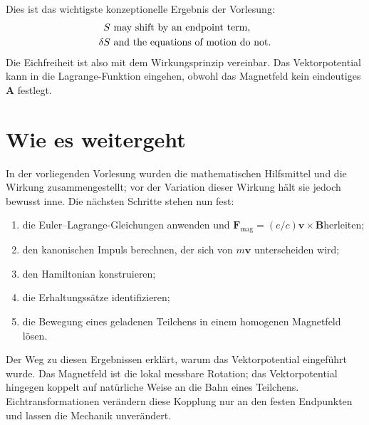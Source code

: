 \begin{classroomqa}
\end{classroomqa}

Dies ist das wichtigste konzeptionelle Ergebnis der Vorlesung:
\begin{equation}
  \begin{aligned}
    S&\ \hbox{may shift by an endpoint term},\\
    \delta S&\ \hbox{and the equations of motion do not}.
  \end{aligned}
\end{equation}
Die Eichfreiheit ist also mit dem Wirkungsprinzip vereinbar. Das Vektorpotential kann in die Lagrange-Funktion eingehen, obwohl das Magnetfeld kein eindeutiges \(\mathbf A\) festlegt.

\section{Wie es weitergeht}

In der vorliegenden Vorlesung wurden die mathematischen Hilfsmittel und die Wirkung zusammengestellt; vor der Variation dieser Wirkung hält sie jedoch bewusst inne. Die nächsten Schritte stehen nun fest:
\begin{enumerate}
  \item die Euler--Lagrange-Gleichungen anwenden und
  \(\mathbf F_{\mathrm{mag}}=(e/c)\mathbf v\times\mathbf B\)herleiten;
  \item den kanonischen Impuls berechnen, der sich von \(m\mathbf v\) unterscheiden wird;
  \item den Hamiltonian konstruieren;
  \item die Erhaltungssätze identifizieren;
  \item die Bewegung eines geladenen Teilchens in einem homogenen Magnetfeld lösen.
\end{enumerate}

Der Weg zu diesen Ergebnissen erklärt, warum das Vektorpotential eingeführt wurde. Das Magnetfeld ist die lokal messbare Rotation; das Vektorpotential hingegen koppelt auf natürliche Weise an die Bahn eines Teilchens. Eichtransformationen verändern diese Kopplung nur an den festen Endpunkten und lassen die Mechanik unverändert.
